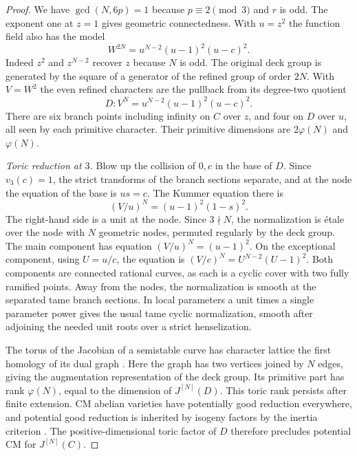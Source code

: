 \documentclass[11pt]{article}
\begin{document}
\begin{proof}
We have \(\gcd(N,6p)=1\) because \(p\equiv2\pmod3\) and \(r\) is
odd. The exponent one at \(z=1\) gives geometric connectedness.
With \(u=z^2\) the function field also has the model
\[
          W^{2N}=u^{N-2}(u-1)^2(u-c)^2.
\]
Indeed \(z^2\) and \(z^{N-2}\) recover \(z\) because \(N\) is odd.
The original deck group is generated by the square of a generator of
the refined group of order \(2N\). With \(V=W^2\) the even refined
characters are the pullback from its degree-two quotient
\[
          D\colon V^N=u^{N-2}(u-1)^2(u-c)^2.
\]
There are six branch points including infinity on \(C\) over \(z\),
and four on \(D\) over \(u\), all seen by each primitive character.
Their primitive dimensions are \(2\varphi(N)\) and \(\varphi(N)\).

\smallskip
\noindent\textit{Toric reduction at \(3\).}
Blow up the collision of \(0,c\) in the base of \(D\). Since
\(v_3(c)=1\), the strict transforms of the branch sections separate,
and at the node the equation of the base is \(us=c\). The Kummer
equation there is
\[
                (V/u)^N=(u-1)^2(1-s)^2.
\]
The right-hand side is a unit at the node. Since \(3\nmid N\),
the normalization is \'{e}tale over the node with \(N\) geometric
nodes, permuted regularly by the deck group. The main component has
equation \((V/u)^N=(u-1)^2\). On the exceptional component, using
\(U=u/c\), the equation is \((V/c)^N=U^{N-2}(U-1)^2\). Both
components are connected rational curves, as each is a cyclic cover
with two fully ramified points. Away from the nodes, the normalization
is smooth at the separated tame branch sections. In local parameters
a unit times a single parameter power gives the usual tame cyclic
normalization, smooth after adjoining the needed unit roots over a
strict henselization.

The torus of the Jacobian of a semistable curve has character lattice
the first homology of its dual graph \cite[(12.3.7), \S12.4]{sga}.
Here the graph has two vertices joined by \(N\) edges, giving the
augmentation representation of the deck group. Its primitive part
has rank \(\varphi(N)\), equal to the dimension of \(J^{[N]}(D)\).
This toric rank persists after finite extension. CM abelian varieties
have potentially good reduction everywhere, and potential good
reduction is inherited by isogeny factors by the inertia criterion
\cite[Theorems~1 and~6]{serretate}. The positive-dimensional toric
factor of \(D\) therefore precludes potential CM for \(J^{[N]}(C)\).


\end{proof}
\end{document}
